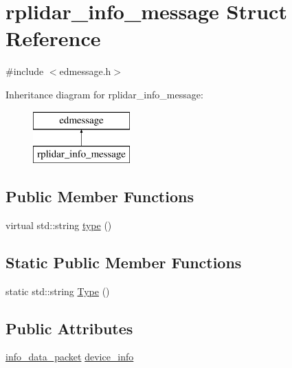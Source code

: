 \hypertarget{structrplidar__info__message}{\section{rplidar\-\_\-info\-\_\-message Struct Reference}
\label{structrplidar__info__message}
}


{\ttfamily \#include $<$edmessage.\-h$>$}

Inheritance diagram for rplidar\-\_\-info\-\_\-message\-:\begin{figure}[H]
\begin{center}
\leavevmode
\includegraphics[height=2.000000cm]{structrplidar__info__message}
\end{center}
\end{figure}
\subsection*{Public Member Functions}
\begin{DoxyCompactItemize}
\item 
virtual std\-::string \hyperlink{structrplidar__info__message_a05bacd569c40d9f88ef4374af34bea49}{type} ()
\end{DoxyCompactItemize}
\subsection*{Static Public Member Functions}
\begin{DoxyCompactItemize}
\item 
static std\-::string \hyperlink{structrplidar__info__message_a14754c933c3157601c2a006ecbf5cf62}{Type} ()
\end{DoxyCompactItemize}
\subsection*{Public Attributes}
\begin{DoxyCompactItemize}
\item 
\hyperlink{structinfo__data__packet}{info\-\_\-data\-\_\-packet} \hyperlink{structrplidar__info__message_a6bb845edccde9eb8568c018ae2070ced}{device\-\_\-info}
\end{DoxyCompactItemize}


